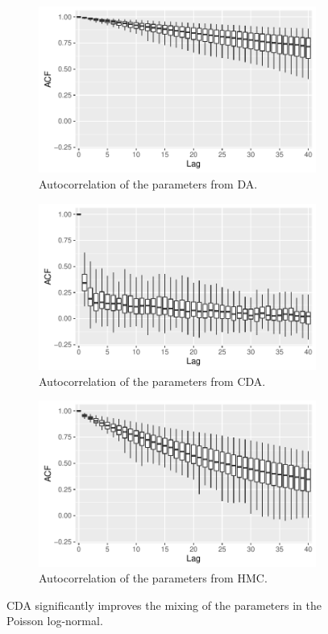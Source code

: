 \documentclass[10pt]{article}
\begin{document}
 \begin{figure}[H]
  \begin{subfigure}[b]{0.32\textwidth}
 \includegraphics[width=1\textwidth]{poisson_acf_da}
 \caption{Autocorrelation of the parameters from DA.}
 \end{subfigure}
  \hfill 
 \begin{subfigure}[b]{0.32\textwidth}
 \includegraphics[width=1\textwidth]{poisson_acf_cda}
 \caption{Autocorrelation of the parameters from CDA.}
 \end{subfigure}  \hfill 
 \begin{subfigure}[b]{0.32\textwidth}
 \includegraphics[width=1\textwidth]{poisson_acf_hmc}
 \caption{Autocorrelation of the parameters from HMC.}
 \end{subfigure}
 \caption{CDA significantly improves the mixing of the parameters in the Poisson log-normal.}
 \label{data_poisson}
 \end{figure}
\end{document}

